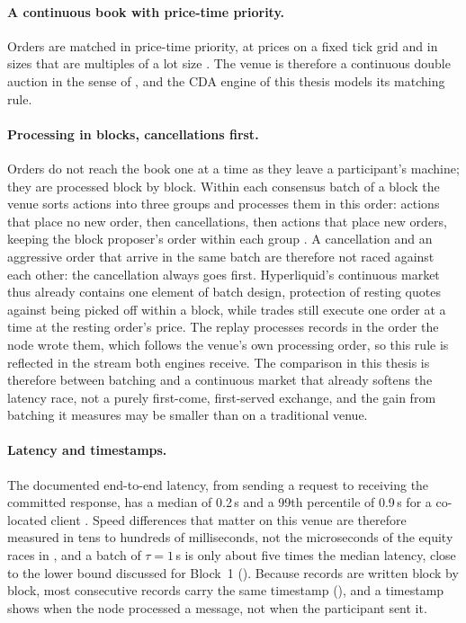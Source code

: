 \paragraph{A continuous book with price-time priority.} Orders are matched
in price-time priority, at prices on a fixed tick grid and in sizes that are
multiples of a lot size \citep{hyperliquid2026docs}. The venue is therefore
a continuous double auction in the sense of , and the CDA
engine of this thesis models its matching rule.

\paragraph{Processing in blocks, cancellations first.} Orders do not reach
the book one at a time as they leave a participant's machine; they are
processed block by block. Within each consensus batch of a block the venue
sorts actions into three groups and processes them in this order: actions
that place no new order, then cancellations, then actions that place new
orders, keeping the block proposer's order within each group
\citep{hyperliquid2026docs}. A cancellation and an aggressive order that
arrive in the same batch are therefore not raced against each other: the
cancellation always goes first. Hyperliquid's continuous market thus already
contains one element of batch design, protection of resting quotes against
being picked off within a block, while trades still execute one order at a
time at the resting order's price. The replay processes records in the order
the node wrote them, which follows the venue's own processing order, so this
rule is reflected in the stream both engines receive. The comparison in this
thesis is therefore between batching and a continuous market that already
softens the latency race, not a purely first-come, first-served exchange,
and the gain from batching it measures may be smaller than on a traditional
venue.

\paragraph{Latency and timestamps.} The documented end-to-end latency,
from sending a request to receiving the committed response, has a median of
0.2\,s and a 99th percentile of 0.9\,s for a co-located client
\citep{hyperliquid2026docs}. Speed differences that matter on this venue are
therefore measured in tens to hundreds of milliseconds, not the
microseconds of the equity races in , and a batch of
$\tau = 1$\,s is only about five times the median latency, close to the lower
bound discussed for Block~1 (). Because records are
written block by block, most consecutive records carry the same timestamp
(), and a timestamp shows when the node processed a
message, not when the participant sent it.

